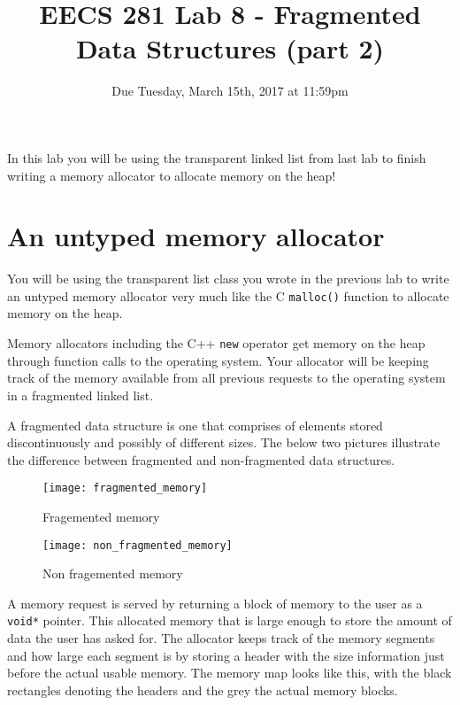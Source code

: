 \documentclass{article}
\begin{document}
\title{\textbf{EECS 281 Lab 8 - Fragmented Data Structures (part 2)}}
\author{Due Tuesday, March 15th, 2017 at 11:59pm}
\date{}
\maketitle
{}
{
   \pagestyle{empty}
}
\thispagestyle{firststyle}

In this lab you will be using the transparent linked list from last lab to
finish writing a memory allocator to allocate memory on the heap!

\section{An untyped memory allocator}
You will be using the transparent list class you wrote in the previous lab to
write an untyped memory allocator very much like the C \texttt{malloc()}
function to allocate memory on the heap.

Memory allocators including the C++ \texttt{new} operator get memory on the
heap through function calls to the operating system.  Your allocator will be
keeping track of the memory available from all previous requests to the
operating system in a fragmented linked list.

A fragmented data structure is one that comprises of elements stored
discontinuously and possibly of different sizes.  The below two pictures
illustrate the difference between fragmented and non-fragmented data
structures.

\begin{figure}[!htb]
\centering
\texttt{[image: fragmented\_memory]}
\caption{Fragemented memory}
\end{figure}

\begin{figure}[!htb]
\centering
\texttt{[image: non\_fragmented\_memory]}
\caption{Non fragemented memory}
\end{figure}

A memory request is served by returning a block of memory to the user as a
\texttt{void*} pointer.  This allocated memory that is large enough to store
the amount of data the user has asked for.  The allocator keeps track of the
memory segments and how large each segment is by storing a header with the
size information just before the actual usable memory.  The memory map looks
like this, with the black rectangles denoting the headers and the grey the
actual memory blocks.
\end{document}
